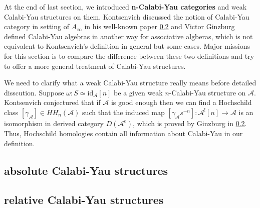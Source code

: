 At the end of last section, we introduced \textbf{n-Calabi-Yau categories} and weak Calabi-Yau structures on them. Kontsenvich discussed the notion of Calabi-Yau category in setting of $A_\infty$ in his well-known paper \ref{} and Victor Ginzburg defined Calabi-Yau algebras in another way for associative algberas, which is not equivalent to Kontsenvich's definition in general but some cases. Major missions for this section is to compare the difference between these two definitions and try to offer a more general treatment of Calabi-Yau structures.
\par
We need to clarify what a weak Calabi-Yau structure really means before detailed disscution. Suppose $\omega: S \simeq \text{id}_{\mathcal{A}}[n]$ be a given weak $n$-Calabi-Yau structure on $\mathcal{A}$. Kontsenvich conjectured that if $\mathcal{A}$ is good enough then we can find a Hochschild class $[\gamma_{\mathcal{A}}] \in HH_n(\mathcal{A})$ such that the induced map $[\gamma_{\mathcal{A}} s^{-n}]: \mathcal{A}^! [n] \rightarrow \mathcal{A}$ is an isomorphism in derived category $D(\mathcal{A}^{e})$, which is proved by Ginzburg in \ref{}. Thus, Hochschild homologies contain all information about Calabi-Yau in our definition.
\subsection{absolute Calabi-Yau structures}
	
\subsection{relative Calabi-Yau structures}